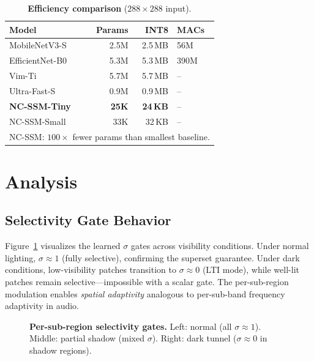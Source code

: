 \documentclass[10pt,twocolumn,letterpaper]{article}
\begin{document}
\begin{table}[t]
\centering
\caption{\textbf{Efficiency comparison} ($288{\times}288$ input).}
\label{tab:efficiency}
\setlength{\tabcolsep}{4pt}
\footnotesize
\begin{tabular}{@{}lrrl@{}}
\toprule
\textbf{Model} & \textbf{Params} & \textbf{INT8} & \textbf{MACs} \\
\midrule
MobileNetV3-S & 2.5M & 2.5\,MB & 56M \\
EfficientNet-B0 & 5.3M & 5.3\,MB & 390M \\
Vim-Ti & 5.7M & 5.7\,MB & -- \\
Ultra-Fast-S & 0.9M & 0.9\,MB & -- \\
\midrule
\textbf{NC-SSM-Tiny} & \textbf{25K} & \textbf{24\,KB} & -- \\
NC-SSM-Small & 33K & 32\,KB & -- \\
\bottomrule
\multicolumn{4}{l}{\scriptsize NC-SSM: $100{\times}$ fewer params than smallest baseline.}
\end{tabular}
\end{table}

\section{Analysis}
\label{sec:analysis}

\subsection{Selectivity Gate Behavior}

Figure~\ref{fig:sigma_gates} visualizes the learned $\sigma$ gates across visibility conditions.
Under normal lighting, $\sigma \approx 1$ (fully selective), confirming the superset guarantee.
Under dark conditions, low-visibility patches transition to $\sigma \approx 0$ (LTI mode), while well-lit patches remain selective---impossible with a scalar gate.
The per-sub-region modulation enables \emph{spatial adaptivity} analogous to per-sub-band frequency adaptivity in audio.

\begin{figure}[t]
\centering
\caption{\textbf{Per-sub-region selectivity gates.} Left: normal (all $\sigma \approx 1$). Middle: partial shadow (mixed $\sigma$). Right: dark tunnel ($\sigma \approx 0$ in shadow regions).}
\label{fig:sigma_gates}
\end{figure}
\end{document}
